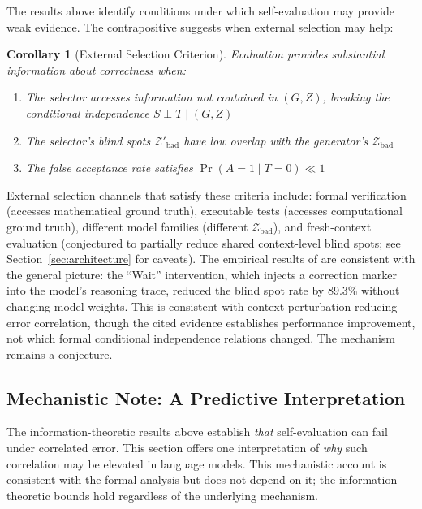 \documentclass[11pt]{article}
\newtheorem{corollary}[theorem]{Corollary}
\begin{document}
The results above identify conditions under which self-evaluation may provide weak evidence.
The contrapositive suggests when external selection may help:

\begin{corollary}[External Selection Criterion]
\label{cor:external_selection}
Evaluation provides substantial information about correctness when:
\begin{enumerate}
\item The selector accesses information not contained in $(G, Z)$, breaking the conditional
independence $S \perp T \mid (G, Z)$
\item The selector's blind spots $\mathcal{Z}'_{\mathrm{bad}}$ have low overlap with the
generator's $\mathcal{Z}_{\mathrm{bad}}$
\item The false acceptance rate satisfies $\Pr(A = 1 \mid T = 0) \ll 1$
\end{enumerate}
\end{corollary}

External selection channels that satisfy these criteria include: formal verification
(accesses mathematical ground truth), executable tests (accesses computational ground truth),
different model families (different $\mathcal{Z}_{\mathrm{bad}}$), and fresh-context
evaluation (conjectured to partially reduce shared context-level blind spots; see
Section~\ref{sec:architecture} for caveats). The empirical results of
\citet{tsui2025selfcorrection} are consistent with the general picture: the ``Wait''
intervention, which injects a correction marker into the model's reasoning trace, reduced
the blind spot rate by 89.3\% without changing model weights. This is consistent with
context perturbation reducing error correlation, though the cited evidence establishes
performance improvement, not which formal conditional independence relations changed.
The mechanism remains a conjecture.

\subsection{Mechanistic Note: A Predictive Interpretation}

The information-theoretic results above establish \textit{that} self-evaluation can fail
under correlated error. This section offers one interpretation of \textit{why} such
correlation may be elevated in language models. This mechanistic account is consistent with
the formal analysis but does not depend on it; the information-theoretic bounds hold
regardless of the underlying mechanism.
\end{document}

